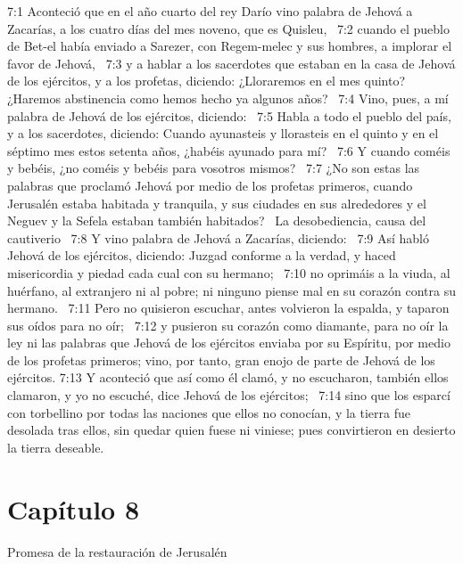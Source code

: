 7:1 Aconteció que en el año cuarto del rey Darío vino palabra de Jehová a Zacarías, a los cuatro días del mes noveno, que es Quisleu,  
7:2 cuando el pueblo de Bet-el había enviado a Sarezer, con Regem-melec y sus hombres, a implorar el favor de Jehová,  
7:3 y a hablar a los sacerdotes que estaban en la casa de Jehová de los ejércitos, y a los profetas, diciendo: ¿Lloraremos en el mes quinto? ¿Haremos abstinencia como hemos hecho ya algunos años?  
7:4 Vino, pues, a mí palabra de Jehová de los ejércitos, diciendo:  
7:5 Habla a todo el pueblo del país, y a los sacerdotes, diciendo: Cuando ayunasteis y llorasteis en el quinto y en el séptimo mes estos setenta años, ¿habéis ayunado para mí?  
7:6 Y cuando coméis y bebéis, ¿no coméis y bebéis para vosotros mismos?  
7:7 ¿No son estas las palabras que proclamó Jehová por medio de los profetas primeros, cuando Jerusalén estaba habitada y tranquila, y sus ciudades en sus alrededores y el Neguev y la Sefela estaban también habitados?  
La desobediencia, causa del cautiverio  
7:8 Y vino palabra de Jehová a Zacarías, diciendo:  
7:9 Así habló Jehová de los ejércitos, diciendo: Juzgad conforme a la verdad, y haced misericordia y piedad cada cual con su hermano;  
7:10 no oprimáis a la viuda, al huérfano, al extranjero ni al pobre; ni ninguno piense mal en su corazón contra su hermano.  
7:11 Pero no quisieron escuchar, antes volvieron la espalda, y taparon sus oídos para no oír;  
7:12 y pusieron su corazón como diamante, para no oír la ley ni las palabras que Jehová de los ejércitos enviaba por su Espíritu, por medio de los profetas primeros; vino, por tanto, gran enojo de parte de Jehová de los ejércitos. 
7:13 Y aconteció que así como él clamó, y no escucharon, también ellos clamaron, y yo no escuché, dice Jehová de los ejércitos;  
7:14 sino que los esparcí con torbellino por todas las naciones que ellos no conocían, y la tierra fue desolada tras ellos, sin quedar quien fuese ni viniese; pues convirtieron en desierto la tierra deseable.  
\section*{Capítulo 8 }
Promesa de la restauración de Jerusalén  

